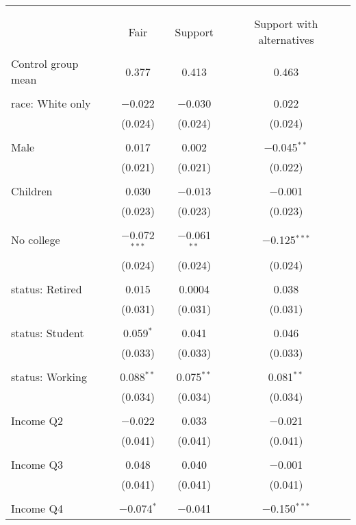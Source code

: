 
\begin{tabular}{@{\extracolsep{5pt}}lccc} 
\\[-1.8ex]\hline 
\hline \\[-1.8ex] 
\\[-1.8ex] & Fair & Support & Support with alternatives \\ 
\hline \\[-1.8ex] 
 Control group mean & 0.377 & 0.413 & 0.463  \\ \hline \\[-1.8ex] race: White only & $-$0.022 & $-$0.030 & 0.022 \\ 
  & (0.024) & (0.024) & (0.024) \\ 
  & & & \\ 
 Male & 0.017 & 0.002 & $-$0.045$^{**}$ \\ 
  & (0.021) & (0.021) & (0.022) \\ 
  & & & \\ 
 Children & 0.030 & $-$0.013 & $-$0.001 \\ 
  & (0.023) & (0.023) & (0.023) \\ 
  & & & \\ 
 No college & $-$0.072$^{***}$ & $-$0.061$^{**}$ & $-$0.125$^{***}$ \\ 
  & (0.024) & (0.024) & (0.024) \\ 
  & & & \\ 
 status: Retired & 0.015 & 0.0004 & 0.038 \\ 
  & (0.031) & (0.031) & (0.031) \\ 
  & & & \\ 
 status: Student & 0.059$^{*}$ & 0.041 & 0.046 \\ 
  & (0.033) & (0.033) & (0.033) \\ 
  & & & \\ 
 status: Working & 0.088$^{**}$ & 0.075$^{**}$ & 0.081$^{**}$ \\ 
  & (0.034) & (0.034) & (0.034) \\ 
  & & & \\ 
 Income Q2 & $-$0.022 & 0.033 & $-$0.021 \\ 
  & (0.041) & (0.041) & (0.041) \\ 
  & & & \\ 
 Income Q3 & 0.048 & 0.040 & $-$0.001 \\ 
  & (0.041) & (0.041) & (0.041) \\ 
  & & & \\ 
 Income Q4 & $-$0.074$^{*}$ & $-$0.041 & $-$0.150$^{***}$ \\ 

\end{tabular}
